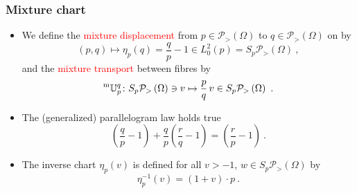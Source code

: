 \documentclass[xcolor=svgnames]{beamer}
\newcommand{\Bspaceat}[1]{L^2_0(#1)}
\newcommand{\expfibreat}[2]{S_{#1}#2}
\newcommand{\mtransport}[2]{\prescript{\text{m}}{} {\mathbb U} _ {#1} ^ {#2}}
\newcommand{\opensimplexon}[1]{\mathcal P_>\left(#1\right)}
\newcommand{\rosso}[1]{\textcolor{red}{#1}}
\renewcommand{\emph}{\rosso}
\begin{document}
\begin{frame}[plain]\small\frametitle{Mixture chart}
\begin{itemize}
\item  We define the \emph{mixture displacement} from $p \in \opensimplexon \Omega$ to $q \in \opensimplexon \Omega$ on by
       \begin{equation*}
   (p,q) \mapsto \eta_p(q) = \frac q p - 1 \in \Bspaceat p = \expfibreat p {\opensimplexon \Omega} \ ,
    \end{equation*}
    and the \emph{mixture transport} between fibres by
    \begin{equation*}
      \mtransport p q \colon \expfibreat p {\opensimplexon \Omega} \ni v \mapsto \frac p q \, v \in \expfibreat p {\opensimplexon \Omega} \ .
    \end{equation*}
\item The (generalized) parallelogram law holds true
  \begin{equation*}
 \left(\frac q p -1\right) + \frac q p \left(\frac r q -1\right) = \left(\frac r p -1\right) \ .
\end{equation*}
\item The inverse chart $\eta_p(v)$ is defined for all $v > -1$, $w \in \expfibreat p {\opensimplexon \Omega}$ by
  \begin{equation*}
    \eta^{-1}_p(v) =  (1+v) \cdot p \ .
  \end{equation*}
\end{itemize} 

\end{frame}
\end{document}
